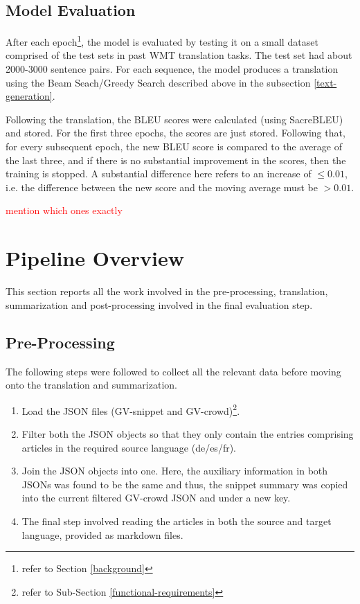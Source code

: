 \documentclass[12pt,a4paper,twoside,openright]{report}
\newcommand{\red}[1]{\textcolor{red}{#1}}
\begin{document}
\subsection{Model Evaluation}
\label{model-evaluation}
After each epoch\footnote{refer to Section \ref{background}}, the model is evaluated by testing it on a small dataset comprised of the test sets in past WMT translation tasks. The test set had about 2000-3000 sentence pairs. For each sequence, the model produces a translation using the Beam Seach/Greedy Search described above in the subsection \ref{text-generation}.

Following the translation, the BLEU scores were calculated (using SacreBLEU) and stored. For the first three epochs, the scores are just stored. Following that, for every subsequent epoch, the new BLEU score is compared to the average of the last three, and if there is no substantial improvement in the scores, then the training is stopped. A substantial difference here refers to an increase of $\leq 0.01$, i.e. the difference between the new score and the moving average must be $> 0.01$.

\red{mention which ones exactly}

\section{Pipeline Overview}
\label{pipeline-overview}
This section reports all the work involved in the pre-processing, translation, summarization and post-processing involved in the final evaluation step.

\subsection{Pre-Processing}
\label{preprocessing}
The following steps were followed to collect all the relevant data before moving onto the translation and summarization.
\begin{enumerate}
    \item Load the JSON files (GV-snippet and GV-crowd)\footnote{refer to Sub-Section \ref{functional-requirements}}.
    \item Filter both the JSON objects so that they only contain the entries comprising articles in the required source language (de/es/fr).
    \item Join the JSON objects into one. Here, the auxiliary information in both JSONs was found to be the same and thus, the snippet summary was copied into the current filtered GV-crowd JSON and under a new key.
    \item The final step involved reading the articles in both the source and target language, provided as markdown files.
\end{enumerate}
\end{document}
